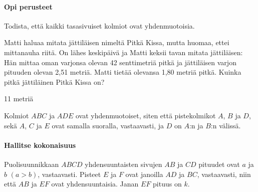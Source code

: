 \begin{tehtavasivu}

\paragraph*{Opi perusteet}

\begin{tehtava}
Todista, että kaikki tasasivuiset kolmiot ovat yhdenmuotoisia.
\end{tehtava}

\begin{tehtava}
Matti haluaa mitata jättiläisen nimeltä Pitkä Kissa, mutta huomaa, ettei mittanauha riitä. On lähes keskipäivä ja Matti keksii tavan mitata jättiläisen: Hän mittaa oman varjonsa olevan 42 senttimetriä pitkä ja jättiläisen varjon pituuden olevan 2,51 metriä. Matti tietää olevansa 1,80 metriä pitkä. Kuinka pitkä jättiläinen Pitkä Kissa on?

\begin{vastaus}
11 metriä
\end{vastaus}
\end{tehtava}

\begin{tehtava}
Kolmiot $ABC$ ja $ADE$ ovat yhdenmuotoiset, siten että pistekolmikot $A$, $B$ ja $D$, sekä $A$, $C$ ja $E$ ovat samalla suoralla, vastaavasti, ja $D$ on $A$:n ja $B$:n välissä.
\end{tehtava}

\paragraph*{Hallitse kokonaisuus}
\begin{tehtava}
Puolisuunnikkaan $ABCD$ yhdensuuntaisten sivujen $AB$ ja $CD$ pituudet ovat $a$ ja $b$ $(a > b)$, vastaavasti. Pisteet $E$ ja $F$ ovat janoilla $AD$ ja $BC$, vastaavasti, niin että $AB$ ja $EF$ ovat yhdensuuntaisia. Janan $EF$ pituus on $k$.



\end{tehtava}
\end{tehtavasivu}
